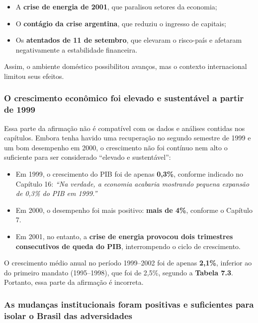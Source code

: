 \documentclass[a4paper,12pt]{article}[abntex2]
\begin{document}
\begin{itemize}
    \item A \textbf{crise de energia de 2001}, que paralisou setores da economia;
    \item O \textbf{contágio da crise argentina}, que reduziu o ingresso de capitais;
    \item Os \textbf{atentados de 11 de setembro}, que elevaram o risco-país e afetaram negativamente a estabilidade financeira.
\end{itemize}

Assim, o ambiente doméstico possibilitou avanços, mas o contexto internacional limitou seus efeitos.

\subsubsection{\textbf{O crescimento econômico foi elevado e sustentável a partir de 1999}}

Essa parte da afirmação não é compatível com os dados e análises contidas nos capítulos. Embora tenha havido uma recuperação no segundo semestre de 1999 e um bom desempenho em 2000, o crescimento não foi contínuo nem alto o suficiente para ser considerado “elevado e sustentável”:

\begin{itemize}
    \item Em 1999, o crescimento do PIB foi de apenas \textbf{0,3\%}, conforme indicado no Capítulo 16: \textit{“Na verdade, a economia acabaria mostrando pequena expansão de 0,3\% do PIB em 1999.”}
    \item Em 2000, o desempenho foi mais positivo: \textbf{mais de 4\%}, conforme o Capítulo 7.
    \item Em 2001, no entanto, a \textbf{crise de energia provocou dois trimestres consecutivos de queda do PIB}, interrompendo o ciclo de crescimento.
\end{itemize}

O crescimento médio anual no período 1999–2002 foi de apenas \textbf{2,1\%}, inferior ao do primeiro mandato (1995–1998), que foi de 2,5\%, segundo a \textbf{Tabela 7.3}. Portanto, essa parte da afirmação é incorreta.

\subsubsection{\textbf{As mudanças institucionais foram positivas e suficientes para isolar o Brasil das adversidades}}
\end{document}

